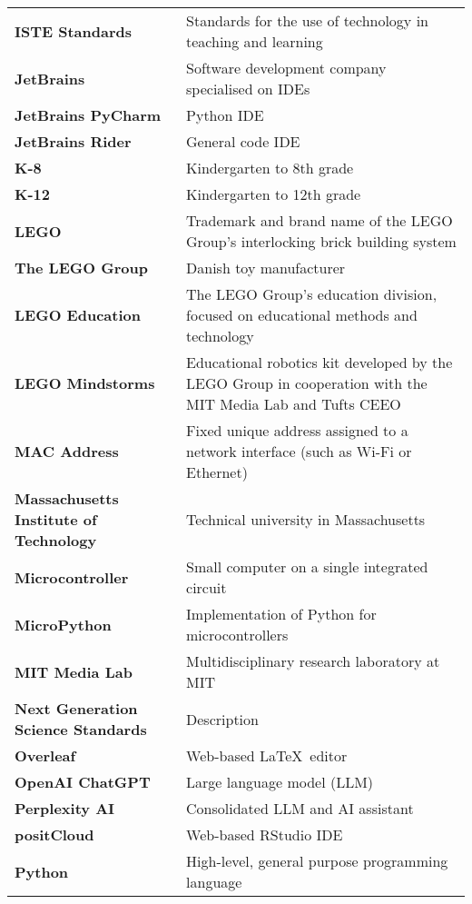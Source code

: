 {\begin{longtable}{>{\raggedright \bfseries}p{} p{}}
ISTE Standards      & Standards for the use of technology in teaching and learning \\
JetBrains           & Software development company specialised on IDEs \\
JetBrains PyCharm   & Python IDE \\
JetBrains Rider     & General code IDE \\
K-8                 & Kindergarten to 8th grade \\
K-12                & Kindergarten to 12th grade \\
LEGO                & Trademark and brand name of the LEGO Group's interlocking brick building system \\
The LEGO Group      & Danish toy manufacturer \\
LEGO Education      & The LEGO Group's education division, focused on educational methods and technology \\
LEGO Mindstorms     & Educational robotics kit developed by the LEGO Group in cooperation with the MIT Media Lab and Tufts CEEO \\
MAC Address         & Fixed unique address assigned to a network interface (such as Wi-Fi or Ethernet)\\
Massachusetts Institute of Technology & Technical university in Massachusetts \\
Microcontroller     & Small computer on a single integrated circuit \\
MicroPython         & Implementation of Python for microcontrollers \\
MIT Media Lab       & Multidisciplinary research laboratory at MIT \\
Next Generation Science Standards & Description \\
Overleaf            & Web-based \LaTeX\ editor  \\
OpenAI ChatGPT      & Large language model (LLM) \\
Perplexity AI       & Consolidated LLM and AI assistant  \\
positCloud          & Web-based RStudio IDE \\
Python              & High-level, general purpose programming language \\

\end{longtable}}
